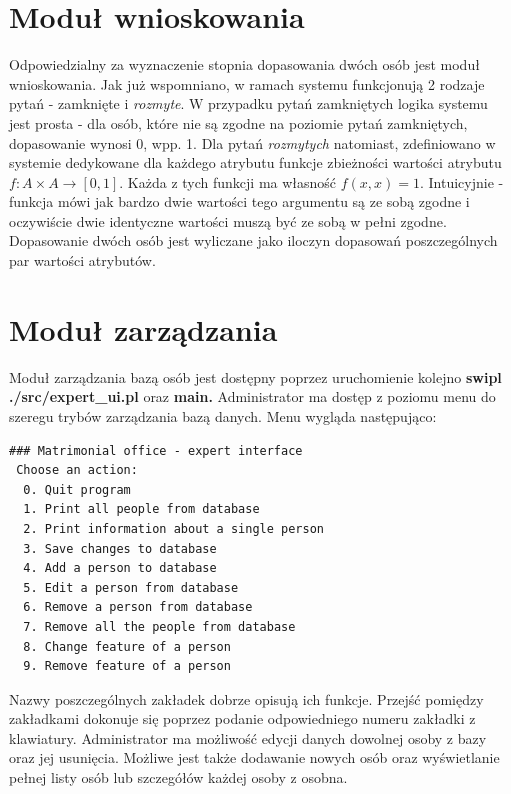 \documentclass[12pt]{article}
\begin{document}
\section{Moduł wnioskowania}
Odpowiedzialny za wyznaczenie stopnia dopasowania dwóch osób jest moduł wnioskowania. Jak już wspomniano, w ramach systemu funkcjonują 2 rodzaje pytań - zamknięte i \textit{rozmyte}. W przypadku pytań zamkniętych logika systemu jest prosta - dla osób, które nie są zgodne na poziomie pytań zamkniętych, dopasowanie wynosi 0, wpp. 1. Dla pytań \textit{rozmytych} natomiast, zdefiniowano w systemie dedykowane dla każdego atrybutu funkcje zbieżności wartości atrybutu $f: A \times A \rightarrow [0, 1]$. Każda z tych funkcji ma własność $f(x, x)=1$. Intuicyjnie - funkcja mówi jak bardzo dwie wartości tego argumentu są ze sobą zgodne i oczywiście dwie identyczne wartości muszą być ze sobą w pełni zgodne. Dopasowanie dwóch osób jest wyliczane jako iloczyn dopasowań poszczególnych par wartości atrybutów.
\section{Moduł zarządzania}
Moduł zarządzania bazą osób jest dostępny poprzez uruchomienie kolejno \textbf{swipl ./src/expert\_ui.pl} oraz \textbf{main.}
Administrator ma dostęp z poziomu menu do szeregu trybów zarządzania bazą danych. Menu wygląda następująco:
\begin{verbatim}
### Matrimonial office - expert interface
 Choose an action:
  0. Quit program
  1. Print all people from database
  2. Print information about a single person
  3. Save changes to database
  4. Add a person to database
  5. Edit a person from database
  6. Remove a person from database
  7. Remove all the people from database
  8. Change feature of a person
  9. Remove feature of a person
\end{verbatim}
Nazwy poszczególnych zakładek dobrze opisują ich funkcje. Przejść pomiędzy zakładkami dokonuje się poprzez podanie odpowiedniego numeru zakładki z klawiatury. Administrator ma możliwość edycji danych dowolnej osoby z bazy oraz jej usunięcia. Możliwe jest także dodawanie nowych osób oraz wyświetlanie pełnej listy osób lub szczegółów każdej osoby z osobna.
\end{document}
